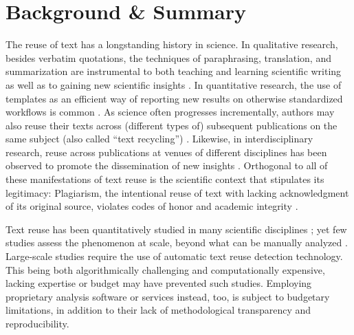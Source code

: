 \section*{Background \& Summary}



The reuse of text has a longstanding history in science. In qualitative research, besides verbatim quotations, the techniques of paraphrasing, translation, and summarization are instrumental to both teaching and learning scientific writing as well as to gaining new scientific insights \cite{sun:2015}. In quantitative research, the use of templates as an efficient way of reporting new results on otherwise standardized workflows is common \cite{anson:2020}. As science often progresses incrementally, authors may also reuse their texts across (different types of) subsequent publications on the same subject (also called ``text recycling'') \cite{moskovitz:2015,hall:2018,anson:2020}. Likewise, in interdisciplinary research, reuse across publications at venues of different disciplines has been observed to promote the dissemination of new insights \cite{bird:2002,wen:2007}. Orthogonal to all of these manifestations of text reuse is the scientific context that stipulates its legitimacy: Plagiarism, the intentional reuse of text with lacking acknowledgment of its original source, violates codes of honor and academic integrity \cite{eberle:2013}.

Text reuse has been quantitatively studied in many scientific disciplines \cite{ganascia:2014,citron:2015,sun:2015,horbach:2019,anson:2020};
yet few studies assess the phenomenon at scale, beyond what can be manually analyzed \cite{citron:2015,horbach:2019}. Large-scale studies require the use of automatic text reuse detection technology. This being both algorithmically challenging and computationally expensive, lacking expertise or budget may have prevented such studies. Employing proprietary analysis software or services instead, too, is subject to budgetary limitations, in addition to their lack of methodological transparency and reproducibility.

